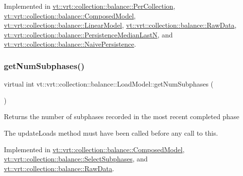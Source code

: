 Implemented in \hyperlink{structvt_1_1vrt_1_1collection_1_1balance_1_1_per_collection_a1e2537d7294b8d1db3ed793d98dfb59c}{vt\+::vrt\+::collection\+::balance\+::\+Per\+Collection}, \hyperlink{classvt_1_1vrt_1_1collection_1_1balance_1_1_composed_model_abf2a02ff624e66c7076bfe3dce961981}{vt\+::vrt\+::collection\+::balance\+::\+Composed\+Model}, \hyperlink{structvt_1_1vrt_1_1collection_1_1balance_1_1_linear_model_a454177a512bbb73e246d3a7ad823c8e4}{vt\+::vrt\+::collection\+::balance\+::\+Linear\+Model}, \hyperlink{structvt_1_1vrt_1_1collection_1_1balance_1_1_raw_data_a8f709c3aeaf10e92c746d773d7ba6f9c}{vt\+::vrt\+::collection\+::balance\+::\+Raw\+Data}, \hyperlink{structvt_1_1vrt_1_1collection_1_1balance_1_1_persistence_median_last_n_accad4d2fe2cc3701966e13bbb5dd793c}{vt\+::vrt\+::collection\+::balance\+::\+Persistence\+Median\+LastN}, and \hyperlink{structvt_1_1vrt_1_1collection_1_1balance_1_1_naive_persistence_a7c4dcce4137f9c112a114686b6cbe691}{vt\+::vrt\+::collection\+::balance\+::\+Naive\+Persistence}.

\mbox{\label{structvt_1_1vrt_1_1collection_1_1balance_1_1_load_model_ab46ea62e4228d4a64de9dd0adfe81af2}} 
\subsubsection{\texorpdfstring{get\+Num\+Subphases()}{getNumSubphases()}}
{\footnotesize\ttfamily virtual int vt\+::vrt\+::collection\+::balance\+::\+Load\+Model\+::get\+Num\+Subphases (\begin{DoxyParamCaption}{ }\end{DoxyParamCaption})\hspace{0.3cm}{\ttfamily [pure virtual]}}

Returns the number of subphases recorded in the most recent completed phase

The {\ttfamily update\+Loads} method must have been called before any call to this. 

Implemented in \hyperlink{classvt_1_1vrt_1_1collection_1_1balance_1_1_composed_model_af3ea09828c281d9c278198a19fe4e533}{vt\+::vrt\+::collection\+::balance\+::\+Composed\+Model}, \hyperlink{classvt_1_1vrt_1_1collection_1_1balance_1_1_select_subphases_a347673e0bbc4ded04f32d97fea8f5b68}{vt\+::vrt\+::collection\+::balance\+::\+Select\+Subphases}, and \hyperlink{structvt_1_1vrt_1_1collection_1_1balance_1_1_raw_data_aeb7830328dfb72f11740e79eed6a23aa}{vt\+::vrt\+::collection\+::balance\+::\+Raw\+Data}.

